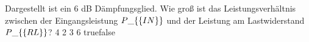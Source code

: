     {Dargestellt ist ein 6 dB Dämpfungsglied. Wie groß ist das Leistungsverhältnis zwischen der Eingangsleistung $P\_\{\textrm\{IN\}\}$ und der Leistung am Lastwiderstand $P\_\{\textrm\{RL\}\}$?}
    {4}
    {2}
    {3}
    {6}
    {true}{false}